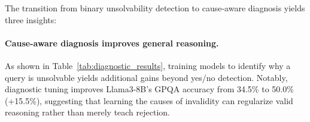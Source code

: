 \begin{table}[t]
\centering
\small
{}
\caption{Results for diagnostic reasoning and clarification transfer. +Diag. models show performance synergies and superior zero-shot transfer to interactive tasks (IN3), enabling proactive questioning.}
\label{tab:diagnostic_results}
\end{table}

The transition from binary unsolvability detection to cause-aware diagnosis yields three insights:

\paragraph{Cause-aware diagnosis improves general reasoning.} As shown in Table~\ref{tab:diagnostic_results}, training models to identify why a query is unsolvable yields additional gains beyond yes/no detection. Notably, diagnostic tuning improves Llama3-8B's GPQA accuracy from 34.5\% to 50.0\% (+15.5\%), suggesting that learning the causes of invalidity can regularize valid reasoning rather than merely teach rejection.

